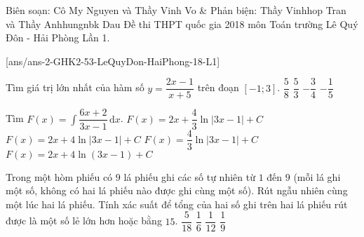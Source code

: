 \begin{name}
{Biên soạn: Cô My Nguyen và Thầy Vinh Vo \& Phản biện: Thầy Vinhhop Tran và Thầy Anhhungnbk Dau}
{Đề thi THPT quốc gia 2018 môn Toán trường  Lê Quý Đôn - Hải Phòng Lần 1.	}
\end{name}
\setcounter{ex}{0}\setcounter{bt}{0}
[ans/ans-2-GHK2-53-LeQuyDon-HaiPhong-18-L1]
\begin{ex}%
Tìm giá trị lớn nhất của hàm số $ y = \dfrac{2x - 1}{x + 5} $ trên đoạn $ [-1;3] $.
\choice
{\True $ \dfrac{5}{8} $}
{$ \dfrac{5}{3} $}
{$ -\dfrac{3}{4} $}
{$ -\dfrac{1}{5} $}
\end{ex}	
\begin{ex}%
Tìm $F(x) =  \displaystyle \int \dfrac{6x + 2}{3x - 1} \mathrm{\, d} x $.	
	\choice
	{\True $ F(x) = \displaystyle 2x + \dfrac{4}{3}\ln|3x - 1| + C $}
	{$ F(x) = \displaystyle 2x + 4\ln|3x - 1| + C $}
	{$ F(x) = \displaystyle  \dfrac{4}{3}\ln|3x - 1| + C $}
	{$ F(x) = \displaystyle 2x + 4\ln(3x - 1) + C $}
\end{ex}	
\begin{ex}%
Trong một hòm phiếu có $ 9 $ lá phiếu ghi các số tự nhiên từ $ 1 $ đến $ 9 $ (mỗi lá ghi một số, không có hai lá phiếu nào được ghi cùng một số). Rút ngẫu nhiên cùng một lúc hai lá phiếu. Tính xác suất để tổng của hai số ghi trên hai lá phiếu rút được là một số lẻ lớn hơn hoặc bằng $ 15 $.	
	\choice
	{$ \dfrac{5}{18} $}
	{$ \dfrac{1}{6} $}
	{\True $ \dfrac{1}{12} $}
	{$ \dfrac{1}{9} $}
\end{ex}	
